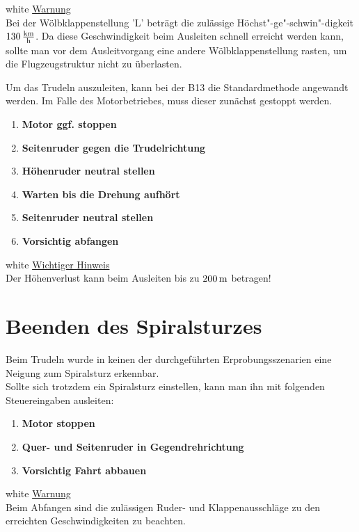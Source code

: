 \begin{color}{white} 
\underline{Warnung}\\
Bei der Wölbklappenstellung 'L' beträgt die zulässige Höchst"-ge"-schwin"-digkeit $\unit[130]{\frac{km}{h}}$. Da diese Geschwindigkeit beim Ausleiten schnell erreicht werden kann, sollte man vor dem Ausleitvorgang eine andere Wölbklappenstellung rasten, um die Flugzeugstruktur nicht zu überlasten.\\
\end{color}


Um das Trudeln auszuleiten, kann bei der B13 die Standardmethode angewandt werden. Im Falle des Motorbetriebes, muss dieser zunächst gestoppt werden.

\begin{enumerate}
\item \textbf{Motor ggf. stoppen}
\item \textbf{Seitenruder gegen die Trudelrichtung}
\item \textbf{Höhenruder neutral stellen}
\item \textbf{Warten bis die Drehung aufhört}
\item \textbf{Seitenruder neutral stellen}
\item \textbf{Vorsichtig abfangen}
\end{enumerate}


\begin{color}{white}
\underline{Wichtiger Hinweis}\\
Der Höhenverlust kann beim Ausleiten bis zu $\unit[200]{m}$ betragen!
\end{color}

\section{Beenden des Spiralsturzes}
Beim Trudeln wurde in keinen der durchgeführten Erprobungsszenarien eine Neigung zum Spiralsturz erkennbar.\\
Sollte sich trotzdem ein Spiralsturz einstellen, kann man ihn mit folgenden Steuereingaben ausleiten:
\begin{enumerate}
\item \textbf{Motor stoppen}
\item \textbf{Quer- und Seitenruder in Gegendrehrichtung}
\item \textbf{Vorsichtig Fahrt abbauen}
\end{enumerate}

\begin{color}{white}
\underline{Warnung}\\
Beim Abfangen sind die zulässigen Ruder- und Klappenausschläge zu den erreichten Geschwindigkeiten zu beachten.
\end{color}

